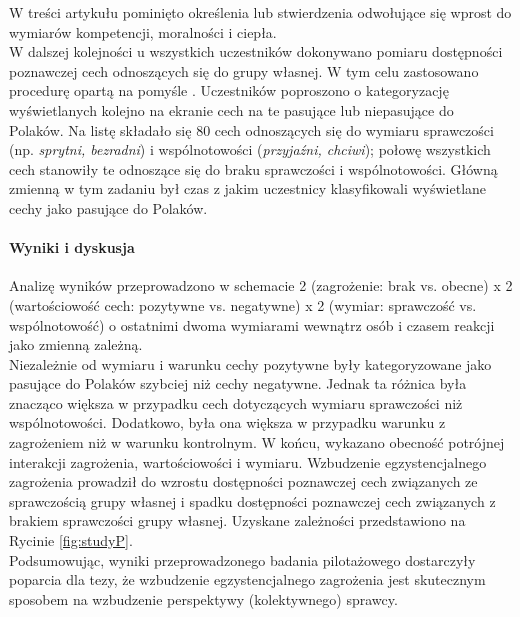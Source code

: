 \documentclass[man]{apa6}
\begin{document}
W treści artykułu pominięto określenia lub stwierdzenia odwołujące się wprost do wymiarów kompetencji, moralności i ciepła.\\

W dalszej kolejności u wszystkich uczestników dokonywano pomiaru dostępności poznawczej cech odnoszących się do grupy własnej. W tym celu zastosowano procedurę opartą na pomyśle \textcite{dodgson1998self}. Uczestników poproszono o kategoryzację wyświetlanych kolejno na ekranie cech na te pasujące lub niepasujące do Polaków. Na listę składało się 80 cech odnoszących się do wymiaru sprawczości (np. \emph{sprytni, bezradni}) i wspólnotowości (\emph{przyjaźni, chciwi}); połowę wszystkich cech stanowiły te odnoszące się do braku sprawczości i wspólnotowości. Główną zmienną w tym zadaniu był czas z jakim uczestnicy klasyfikowali wyświetlane cechy jako pasujące do Polaków.

\paragraph{Wyniki i dyskusja}
Analizę wyników przeprowadzono w schemacie 2 (zagrożenie: brak vs. obecne) x 2 (wartościowość cech: pozytywne vs. negatywne) x 2 (wymiar: sprawczość vs. wspólnotowość) o ostatnimi dwoma wymiarami wewnątrz osób i czasem reakcji jako zmienną zależną.\\

Niezależnie od wymiaru i warunku cechy pozytywne były kategoryzowane jako pasujące do Polaków szybciej niż cechy negatywne. Jednak ta różnica była znacząco większa w przypadku cech dotyczących wymiaru sprawczości niż wspólnotowości. Dodatkowo, była ona większa w przypadku warunku z zagrożeniem niż w warunku kontrolnym. W końcu, wykazano obecność potrójnej interakcji zagrożenia, wartościowości i wymiaru. Wzbudzenie egzystencjalnego zagrożenia prowadził do wzrostu dostępności poznawczej cech związanych ze sprawczością grupy własnej i spadku dostępności poznawczej cech związanych z brakiem sprawczości grupy własnej. Uzyskane zależności przedstawiono na Rycinie \ref{fig:studyP}.\\

Podsumowując, wyniki przeprowadzonego badania pilotażowego dostarczyły poparcia dla tezy, że wzbudzenie egzystencjalnego zagrożenia jest skutecznym sposobem na wzbudzenie perspektywy (kolektywnego) sprawcy.

\begin{figure*}[htbp]
   \centering
   \caption{Szybkość kategoryzacji, jako charakterystyczne dla Polaków, pozytywnych i negatywnch cech sprawczych i wspólnotowych a obecność zagrożenia.}
   \label{fig:studyP}
\end{figure*}
\end{document}
